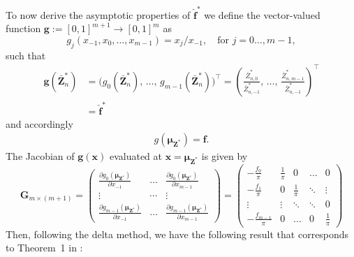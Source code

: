 ﻿\documentclass[12pt,a4paper]{scrreprt}
\theoremstyle{definition}
\begin{document}
\noindent To now derive the asymptotic properties of $\hat{\boldsymbol{f}}^*$ we define the vector-valued function $\boldsymbol{g}:= [0,1]^{m+1} \rightarrow [0,1]^{m}$ as
\[g_j(x_{-1}, x_{0}, \ldots, x_{m-1}) = x_j / x_{-1}, \quad \text{for } j = 0 \ldots, m-1,\]
such that
\begin{align*}
\boldsymbol{g}(\bar{\boldsymbol{Z}}^*_n) 
&= \bigl(g_0(\bar{\boldsymbol{Z}}^*_n),\, \ldots,\, 
   g_{m-1}(\bar{\boldsymbol{Z}}^*_n)\bigr)^\top 
 = \left(\frac{\bar{Z}^*_{n,0}}{\bar{Z}^*_{n,-1}},\, \ldots,\, 
   \frac{\bar{Z}^*_{n,m-1}}{\bar{Z}^*_{n,-1}}\right)^\top \\
&= \hat{\boldsymbol{f}}^*
\end{align*}
and  accordingly
\begin{align*}
    g(\boldsymbol{\mu}_{\boldsymbol{Z}^*}) = \boldsymbol{f}.
\end{align*}
The Jacobian of $\boldsymbol{g}(\boldsymbol{x})$ evaluated at $\boldsymbol{x} = \boldsymbol{\mu}_{\boldsymbol{Z}^*}$ is given by
\[\boldsymbol{G}_{m\times (m+1)} =
\begin{pmatrix}
    \frac{\partial g_0(\boldsymbol{\mu}_{\boldsymbol{Z}^*})}{\partial x_{-1}}& \ldots & \frac{\partial g_0(\boldsymbol{\mu}_{\boldsymbol{Z}^*})}{\partial x_{m-1}}\\
    \vdots & \cdots& \vdots\\
    \frac{\partial g_{m-1}(\boldsymbol{\boldsymbol{\mu}_{\boldsymbol{Z}^*}})}{\partial x_{-1}}& \ldots & \frac{\partial g_{m-1}(\boldsymbol{\mu}_{\boldsymbol{Z}^*})}{\partial x_{m-1}}
\end{pmatrix} =
\begin{pmatrix}
    -\frac{f_0}{\pi} &  \frac{1}{\pi} & 0 & \ldots & 0\\
    -\frac{f_1}{\pi} & 0 & \frac{1}{\pi}&\ddots & \vdots \\
    \vdots & \vdots & \ddots & \ddots & 0\\
    -\frac{f_{m-1}}{\pi}& 0 &\ldots& 0 & \frac{1}{\pi}
\end{pmatrix}\]
Then, following the delta method, we have the following result that corresponds to Theorem~1 in \citet{weiss2021categorical}: 
\end{document}
